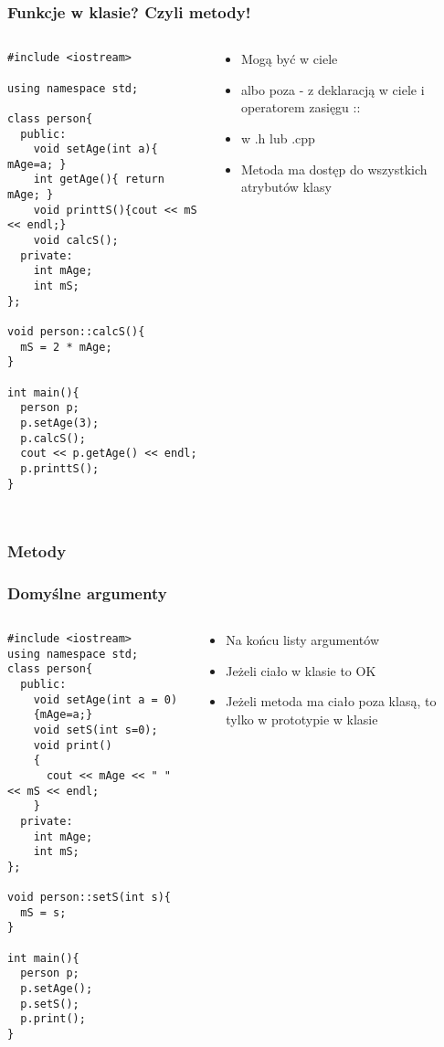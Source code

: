 \documentclass[10pt]{beamer}
\begin{document}
\begin{frame}[fragile]
  \frametitle{Funkcje w klasie? Czyli metody!}
  \begin{columns}
    \begin{column}{0.48\textwidth}
\begin{lstlisting}
#include <iostream>

using namespace std;

class person{
  public:
    void setAge(int a){ mAge=a; }
    int getAge(){ return mAge; }
    void printtS(){cout << mS << endl;}
    void calcS();
  private:
    int mAge;
    int mS;
};

void person::calcS(){
  mS = 2 * mAge;
}

int main(){
  person p;
  p.setAge(3);
  p.calcS();
  cout << p.getAge() << endl;
  p.printtS();
}


\end{lstlisting}
    \end{column}
    \begin{column}{0.48\textwidth}
      \begin{itemize}
        \item Mogą być w ciele
        \item albo poza - z deklaracją w ciele i operatorem zasięgu ::
        \item w .h lub .cpp
        \item Metoda ma dostęp do wszystkich atrybutów klasy  
      \end{itemize}
    \end{column}
  \end{columns}
\end{frame}

\begin{frame}[fragile]
  \frametitle{Metody}
  \frametitle{Domyślne argumenty}
  \begin{columns}
    \begin{column}{0.48\textwidth}
\begin{lstlisting}
#include <iostream>
using namespace std;
class person{
  public:
    void setAge(int a = 0)
    {mAge=a;}
    void setS(int s=0);
    void print()
    {
      cout << mAge << " " << mS << endl;
    }
  private:
    int mAge;
    int mS;
};

void person::setS(int s){
  mS = s;
}

int main(){
  person p;
  p.setAge();
  p.setS();
  p.print();
}


\end{lstlisting}
    \end{column}
    \begin{column}{0.48\textwidth}
      \begin{itemize}
        \item Na końcu listy argumentów
        \item Jeżeli ciało w klasie to OK
        \item Jeżeli metoda ma ciało poza klasą, to tylko w prototypie w klasie
      \end{itemize}
    \end{column}
  \end{columns}
\end{frame}
\end{document}
